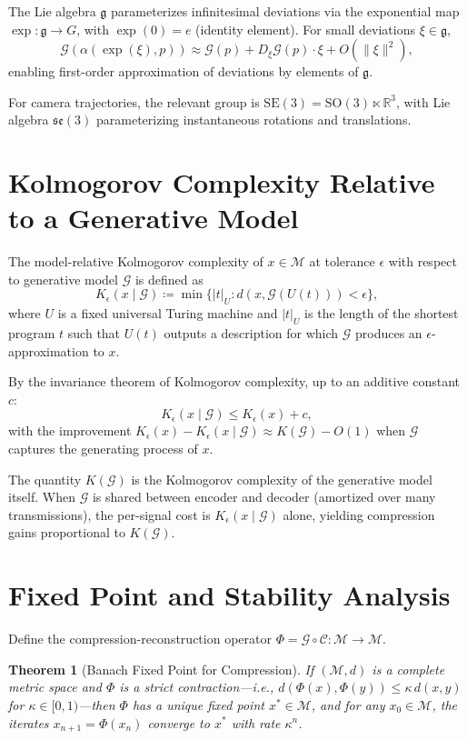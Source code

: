 \documentclass[12pt,a4paper]{article}
\newtheorem{theorem}{Theorem}[section]
\theoremstyle{definition}
\theoremstyle{remark}
\begin{document}
The Lie algebra $\mathfrak{g}$ parameterizes infinitesimal deviations via the exponential map $\exp : \mathfrak{g} \to G$, with $\exp(0) = e$ (identity element). For small deviations $\xi \in \mathfrak{g}$,
\[
\mathcal{G}(\alpha(\exp(\xi), p)) \approx \mathcal{G}(p) + D_\xi \mathcal{G}(p) \cdot \xi + O(\|\xi\|^2),
\]
enabling first-order approximation of deviations by elements of $\mathfrak{g}$.

For camera trajectories, the relevant group is $\mathrm{SE}(3) = \mathrm{SO}(3) \ltimes \mathbb{R}^3$, with Lie algebra $\mathfrak{se}(3)$ parameterizing instantaneous rotations and translations.

\section{Kolmogorov Complexity Relative to a Generative Model}
\label{app:kolmogorov}

The model-relative Kolmogorov complexity of $x \in \mathcal{M}$ at tolerance $\epsilon$ with respect to generative model $\mathcal{G}$ is defined as
\[
K_\epsilon(x \mid \mathcal{G}) \coloneqq \min \{ |t|_U : d(x, \mathcal{G}(U(t))) < \epsilon \},
\]
where $U$ is a fixed universal Turing machine and $|t|_U$ is the length of the shortest program $t$ such that $U(t)$ outputs a description for which $\mathcal{G}$ produces an $\epsilon$-approximation to $x$.

By the invariance theorem of Kolmogorov complexity, up to an additive constant $c$:
\[
K_\epsilon(x \mid \mathcal{G}) \le K_\epsilon(x) + c,
\]
with the improvement $K_\epsilon(x) - K_\epsilon(x \mid \mathcal{G}) \approx K(\mathcal{G}) - O(1)$ when $\mathcal{G}$ captures the generating process of $x$.

The quantity $K(\mathcal{G})$ is the Kolmogorov complexity of the generative model itself. When $\mathcal{G}$ is shared between encoder and decoder (amortized over many transmissions), the per-signal cost is $K_\epsilon(x \mid \mathcal{G})$ alone, yielding compression gains proportional to $K(\mathcal{G})$.

\section{Fixed Point and Stability Analysis}
\label{app:stability}

Define the compression-reconstruction operator $\Phi = \mathcal{G} \circ \mathcal{C} : \mathcal{M} \to \mathcal{M}$.

\begin{theorem}[Banach Fixed Point for Compression]
If $(\mathcal{M}, d)$ is a complete metric space and $\Phi$ is a strict contraction---i.e., $d(\Phi(x), \Phi(y)) \le \kappa \, d(x,y)$ for $\kappa \in [0,1)$---then $\Phi$ has a unique fixed point $x^* \in \mathcal{M}$, and for any $x_0 \in \mathcal{M}$, the iterates $x_{n+1} = \Phi(x_n)$ converge to $x^*$ with rate $\kappa^n$.
\end{theorem}
\end{document}
